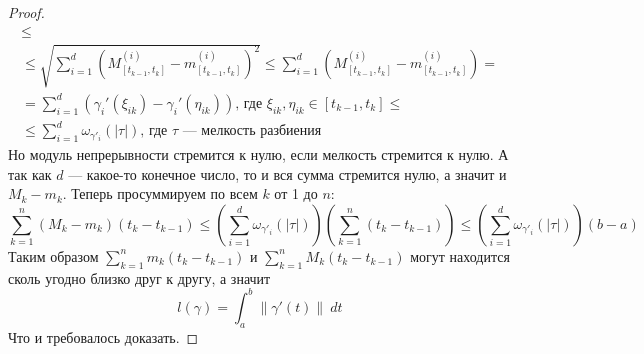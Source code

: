 \begin{proof}
\begin{equation*}
\begin{gathered}
        \leq \\ \leq
        \sqrt{\sum_{i = 1}^{d}\left(M_{[t_{k - 1}, t_k]}^{(i)} - m_{[t_{k - 1}, t_k]}^{(i)}\right)^2} \leq
        \sum\limits_{i = 1}^{d}\left(M_{[t_{k - 1}, t_k]}^{(i)} - m_{[t_{k - 1}, t_{k}]}^{(i)}\right) = \\
        = \sum\limits_{i = 1}^{d}(\gamma_i'(\xi_{ik}) - \gamma_i'(\eta_{ik}))\text{, где }
        \xi_{ik}, \eta_{ik} \in [t_{k - 1}, t_k] \leq \\
        \leq \sum_{i = 1}^{d} \omega_{\gamma'_{i}}(|\tau|)\text{, где } \tau\text{ --- мелкость разбиения}
      \end{gathered}
    \end{equation*}
    Но модуль непрерывности стремится к нулю, если мелкость стремится к нулю. А так как $d$ --- какое-то конечное число, то и вся сумма стремится нулю, а значит и $M_k - m_k$. Теперь просуммируем по всем $k$ от 1 до $n$:
    \begin{equation*}
      \sum\limits_{k = 1}^{n} (M_k - m_k)(t_k - t_{k - 1}) \leq
      \left(\sum_{i = 1}^{d} \omega_{\gamma'_{i}}(|\tau|)\right)\left(\sum\limits_{k = 1}^{n} (t_k - t_{k - 1})\right) \leq \left(\sum_{i = 1}^{d} \omega_{\gamma'_{i}}(|\tau|)\right)(b - a)
    \end{equation*}
    Таким образом $\sum\limits_{k =1}^{n} m_k(t_k - t_{k - 1})$ и $\sum\limits_{k =1}^{n} M_k(t_k - t_{k - 1})$ могут находится сколь угодно близко друг к другу, а значит
    \begin{equation*}
      l(\gamma) = \int_{a}^{b} \| \gamma'(t)\| \: dt
    \end{equation*}
    Что и требовалось доказать.
  \end{proof}
  
